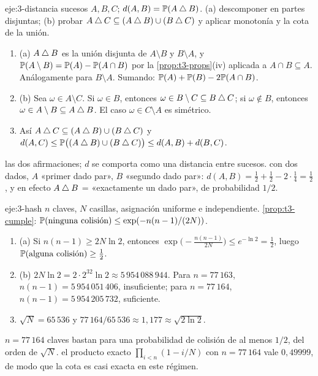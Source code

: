 \begin{solucion}{eje:3-distancia}
\datos sucesos $A,B,C$; $d(A,B)=\mathbb{P}(A\mathbin{\triangle} B)$.
\planteamiento (a) descomponer en partes disjuntas; (b) probar $A\mathbin{\triangle} C\subseteq(A\mathbin{\triangle} B)\cup(B\mathbin{\triangle} C)$ y aplicar monotonía y la cota de la unión.
\pasos
\begin{enumerate}[label=\arabic*.]
  \item (a) $A\mathbin{\triangle} B$ es la unión disjunta de $A\setminus B$ y $B\setminus A$, y $\mathbb{P}(A\setminus B)=\mathbb{P}(A)-\mathbb{P}(A\cap B)$ por la \cref{prop:t3-props}(iv) aplicada a $A\cap B\subseteq A$. Análogamente para $B\setminus A$. Sumando: $\mathbb{P}(A)+\mathbb{P}(B)-2\mathbb{P}(A\cap B)$.
  \item (b) Sea $\omega\in A\setminus C$. Si $\omega\in B$, entonces $\omega\in B\setminus C\subseteq B\mathbin{\triangle} C$; si $\omega\notin B$, entonces $\omega\in A\setminus B\subseteq A\mathbin{\triangle} B$. El caso $\omega\in C\setminus A$ es simétrico.
  \item Así $A\mathbin{\triangle} C\subseteq(A\mathbin{\triangle} B)\cup(B\mathbin{\triangle} C)$ y $d(A,C)\le\mathbb{P}\bigl((A\mathbin{\triangle} B)\cup(B\mathbin{\triangle} C)\bigr)\le d(A,B)+d(B,C)$.
\end{enumerate}
\resultado las dos afirmaciones; $d$ se comporta como una distancia entre sucesos.
\comprobacion con dos dados, $A$ «primer dado par», $B$ «segundo dado par»: $d(A,B)=\frac12+\frac12-2\cdot\frac14=\frac12$, y en efecto $A\mathbin{\triangle} B$ = «exactamente un dado par», de probabilidad $1/2$.
\end{solucion}

\begin{solucion}{eje:3-hash}
\datos $n$ claves, $N$ casillas, asignación uniforme e independiente.
\planteamiento \cref{prop:t3-cumple}: $\mathbb{P}(\text{ninguna colisión})\le\exp(-n(n-1)/(2N))$.
\pasos
\begin{enumerate}[label=\arabic*.]
  \item (a) Si $n(n-1)\ge2N\ln2$, entonces $\exp\bigl(-\frac{n(n-1)}{2N}\bigr)\le e^{-\ln2}=\frac12$, luego $\mathbb{P}(\text{alguna colisión})\ge\frac12$.
  \item (b) $2N\ln2=2\cdot2^{32}\ln2\approx5\,954\,088\,944$. Para $n=77\,163$, $n(n-1)=5\,954\,051\,406$, insuficiente; para $n=77\,164$, $n(n-1)=5\,954\,205\,732$, suficiente.
  \item $\sqrt N=65\,536$ y $77\,164/65\,536\approx1{,}177\approx\sqrt{2\ln2}$.
\end{enumerate}
\resultado $n=77\,164$ claves bastan para una probabilidad de colisión de al menos $1/2$, del orden de $\sqrt N$.
\comprobacion el producto exacto $\prod_{i<n}(1-i/N)$ con $n=77\,164$ vale $0{,}49999$, de modo que la cota es casi exacta en este régimen.
\end{solucion}

